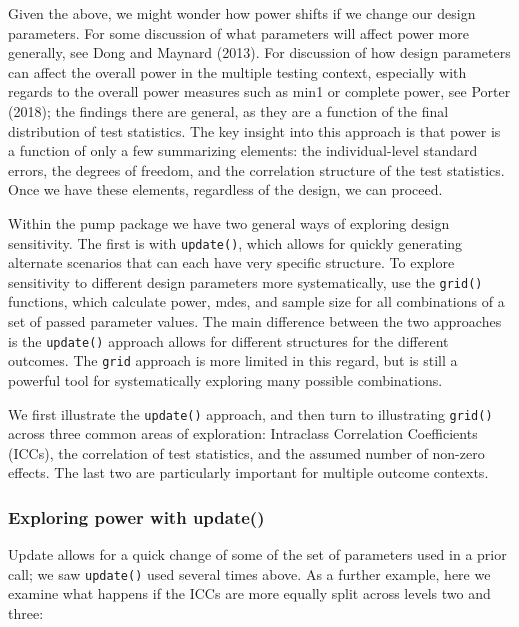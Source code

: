 \documentclass[
]{article}
\begin{document}
Given the above, we might wonder how power shifts if we change our
design parameters. For some discussion of what parameters will affect
power more generally, see Dong and Maynard (2013). For discussion of how
design parameters can affect the overall power in the multiple testing
context, especially with regards to the overall power measures such as
min1 or complete power, see Porter (2018); the findings there are
general, as they are a function of the final distribution of test
statistics. The key insight into this approach is that power is a
function of only a few summarizing elements: the individual-level
standard errors, the degrees of freedom, and the correlation structure
of the test statistics. Once we have these elements, regardless of the
design, we can proceed.

Within the pump package we have two general ways of exploring design
sensitivity. The first is with \texttt{update()}, which allows for
quickly generating alternate scenarios that can each have very specific
structure. To explore sensitivity to different design parameters more
systematically, use the \texttt{grid()} functions, which calculate
power, mdes, and sample size for all combinations of a set of passed
parameter values. The main difference between the two approaches is the
\texttt{update()} approach allows for different structures for the
different outcomes. The \texttt{grid} approach is more limited in this
regard, but is still a powerful tool for systematically exploring many
possible combinations.

We first illustrate the \texttt{update()} approach, and then turn to
illustrating \texttt{grid()} across three common areas of exploration:
Intraclass Correlation Coefficients (ICCs), the correlation of test
statistics, and the assumed number of non-zero effects. The last two are
particularly important for multiple outcome contexts.

\subsubsection{Exploring power with update()}

Update allows for a quick change of some of the set of parameters used
in a prior call; we saw \texttt{update()} used several times above. As a
further example, here we examine what happens if the ICCs are more
equally split across levels two and three:
\end{document}
